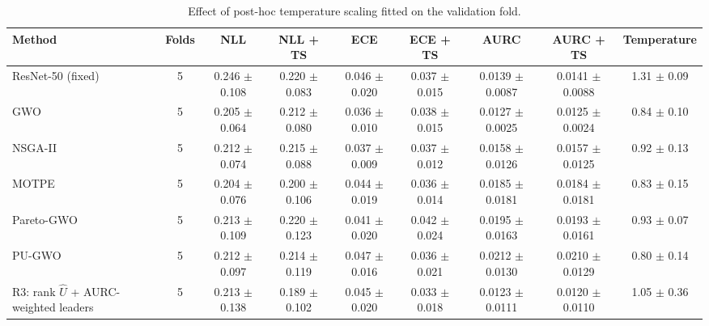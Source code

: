\begin{table}[t]
\centering
\caption{Effect of post-hoc temperature scaling fitted on the validation fold.}
\label{tab:table3b_temperature_scaling}
\small
\begin{tabular}{lcccccccc}
\toprule
Method & Folds & NLL & NLL + TS & ECE & ECE + TS & AURC & AURC + TS & Temperature \\
\midrule
ResNet-50 (fixed) & 5 & 0.246 $\pm$ 0.108 & 0.220 $\pm$ 0.083 & 0.046 $\pm$ 0.020 & 0.037 $\pm$ 0.015 & 0.0139 $\pm$ 0.0087 & 0.0141 $\pm$ 0.0088 & 1.31 $\pm$ 0.09 \\
GWO & 5 & 0.205 $\pm$ 0.064 & 0.212 $\pm$ 0.080 & 0.036 $\pm$ 0.010 & 0.038 $\pm$ 0.015 & 0.0127 $\pm$ 0.0025 & 0.0125 $\pm$ 0.0024 & 0.84 $\pm$ 0.10 \\
NSGA-II & 5 & 0.212 $\pm$ 0.074 & 0.215 $\pm$ 0.088 & 0.037 $\pm$ 0.009 & 0.037 $\pm$ 0.012 & 0.0158 $\pm$ 0.0126 & 0.0157 $\pm$ 0.0125 & 0.92 $\pm$ 0.13 \\
MOTPE & 5 & 0.204 $\pm$ 0.076 & 0.200 $\pm$ 0.106 & 0.044 $\pm$ 0.019 & 0.036 $\pm$ 0.014 & 0.0185 $\pm$ 0.0181 & 0.0184 $\pm$ 0.0181 & 0.83 $\pm$ 0.15 \\
Pareto-GWO & 5 & 0.213 $\pm$ 0.109 & 0.220 $\pm$ 0.123 & 0.041 $\pm$ 0.020 & 0.042 $\pm$ 0.024 & 0.0195 $\pm$ 0.0163 & 0.0193 $\pm$ 0.0161 & 0.93 $\pm$ 0.07 \\
PU-GWO & 5 & 0.212 $\pm$ 0.097 & 0.214 $\pm$ 0.119 & 0.047 $\pm$ 0.016 & 0.036 $\pm$ 0.021 & 0.0212 $\pm$ 0.0130 & 0.0210 $\pm$ 0.0129 & 0.80 $\pm$ 0.14 \\
R3: rank $\hat{U}$ + AURC-weighted leaders & 5 & 0.213 $\pm$ 0.138 & 0.189 $\pm$ 0.102 & 0.045 $\pm$ 0.020 & 0.033 $\pm$ 0.018 & 0.0123 $\pm$ 0.0111 & 0.0120 $\pm$ 0.0110 & 1.05 $\pm$ 0.36 \\
\bottomrule
\end{tabular}
\end{table}
